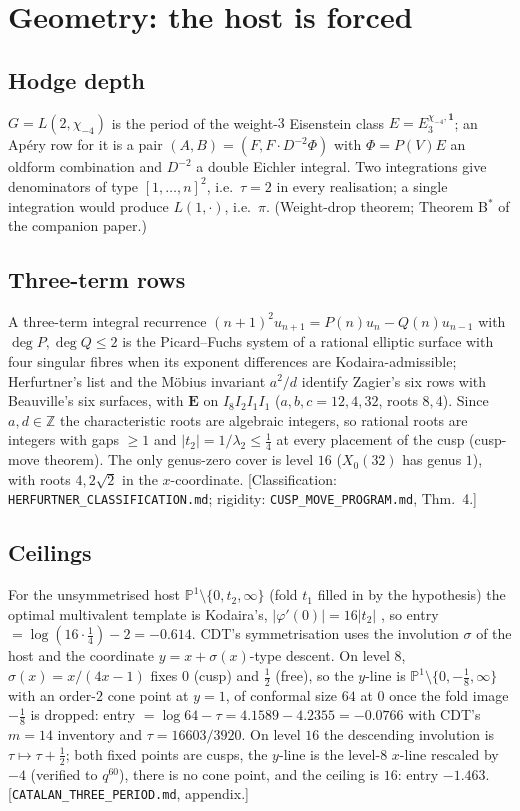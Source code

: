 \documentclass[11pt]{amsart}
\theoremstyle{remark}
\newcommand{\Z}{\mathbb Z}\newcommand{\Q}{\mathbb Q}\newcommand{\R}{\mathbb R}\newcommand{\C}{\mathbb C}
\begin{document}
\section{Geometry: the host is forced}
\subsection{Hodge depth} $G=L(2,\chi_{-4})$ is the period of the weight-$3$ Eisenstein class $E=E_3^{\chi_{-4},\mathbf 1}$; an Ap\'ery row for it is a pair $(A,B)=(F,F\cdot D^{-2}\Phi)$ with $\Phi=P(V)E$ an oldform combination and $D^{-2}$ a double Eichler integral. Two integrations give denominators of type $[1,\dots,n]^2$, i.e.\ $\tau=2$ in every realisation; a single integration would produce $L(1,\cdot)$, i.e.\ $\pi$. (Weight-drop theorem; Theorem B$^*$ of the companion paper.)

\subsection{Three-term rows} A three-term integral recurrence $(n+1)^2u_{n+1}=P(n)u_n-Q(n)u_{n-1}$ with $\deg P,\deg Q\le2$ is the Picard--Fuchs system of a rational elliptic surface with four singular fibres when its exponent differences are Kodaira-admissible; Herfurtner's list and the M\"obius invariant $a^2/d$ identify Zagier's six rows with Beauville's six surfaces, with $\mathbf E$ on $I_8I_2I_1I_1$ ($a,b,c=12,4,32$, roots $8,4$). Since $a,d\in\Z$ the characteristic roots are algebraic integers, so rational roots are integers with gaps $\ge1$ and $|t_2|=1/\lambda_2\le\tfrac14$ at every placement of the cusp (cusp-move theorem). The only genus-zero cover is level $16$ ($X_0(32)$ has genus $1$), with roots $4,2\sqrt2$ in the $x$-coordinate. [Classification: \texttt{HERFURTNER\_CLASSIFICATION.md}; rigidity: \texttt{CUSP\_MOVE\_PROGRAM.md}, Thm.~4.]

\subsection{Ceilings} For the unsymmetrised host $\mathbb P^1\setminus\{0,t_2,\infty\}$ (fold $t_1$ filled in by the hypothesis) the optimal multivalent template is Kodaira's, $|\varphi'(0)|=16|t_2|$ \cite[\S1]{CDTl2chi}, so entry $=\log(16\cdot\tfrac14)-2=-0.614$. CDT's symmetrisation uses the involution $\sigma$ of the host and the coordinate $y=x+\sigma(x)$-type descent. On level $8$, $\sigma(x)=x/(4x-1)$ fixes $0$ (cusp) and $\tfrac12$ (free), so the $y$-line is $\mathbb P^1\setminus\{0,-\tfrac18,\infty\}$ with an order-$2$ cone point at $y=1$, of conformal size $64$ at $0$ once the fold image $-\tfrac18$ is dropped: entry $=\log64-\tau=4.1589-4.2355=-0.0766$ with CDT's $m=14$ inventory and $\tau=16603/3920$. On level $16$ the descending involution is $\tau\mapsto\tau+\tfrac12$; both fixed points are cusps, the $y$-line is the level-$8$ $x$-line rescaled by $-4$ (verified to $q^{60}$), there is no cone point, and the ceiling is $16$: entry $-1.463$. [\texttt{CATALAN\_THREE\_PERIOD.md}, appendix.]
\end{document}

